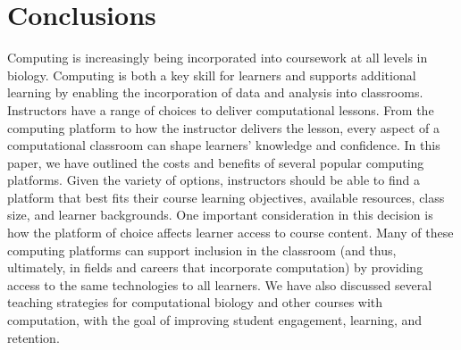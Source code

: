 \section{Conclusions}

Computing is increasingly being incorporated into coursework at all levels in biology.
Computing is both a key skill for learners and supports additional learning by enabling the incorporation of data and analysis into classrooms. 
Instructors have a range of choices to deliver computational lessons.
From the computing platform to how the instructor delivers the lesson, every aspect of a computational classroom can shape learners' knowledge and confidence. 
In this paper, we have outlined the costs and benefits of several popular computing platforms.
Given the variety of options, instructors should be able to find a platform that best fits their course learning objectives, available resources, class size, and learner backgrounds.
One important consideration in this decision is how the platform of choice affects learner access to course content.
Many of these computing platforms can support inclusion in the classroom (and thus, ultimately, in fields and careers that incorporate computation) by providing access to the same technologies to all learners.
We have also discussed several teaching strategies for computational biology and other courses with computation, with the goal of improving student engagement, learning, and retention.





